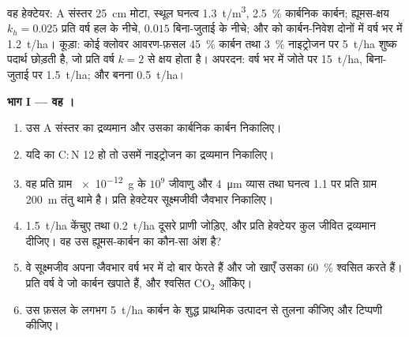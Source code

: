\begin{problem}
\label{pb:b2:living-soil:1}
वह हेक्टेयर: A संस्तर \qty{25}{cm} मोटा, स्थूल घनत्व
\qty{1.3}{t/m^3}, \qty{2.5}{\%} कार्बनिक कार्बन; ह्यूमस-क्षय $k_h =
0.025$ प्रति वर्ष हल के नीचे, $0.015$ बिना-जुताई के नीचे; और  को
कार्बन-निवेश दोनों में वर्ष भर में \qty{1.2}{t/ha}। कूड़ा: कोई
क्लोवर आवरण-फ़सल \qty{45}{\%} कार्बन तथा \qty{3}{\%} नाइट्रोजन पर
\qty{5}{t/ha} शुष्क पदार्थ छोड़ती है, जो प्रति वर्ष $k = 2$
से क्षय होता है। अपरदन: वर्ष भर में जोते पर \qty{15}{t/ha}, बिना-जुताई पर
\qty{1.5}{t/ha}; और बनना \qty{0.5}{t/ha}।

\medskip
\noindent\textbf{भाग I --- वह ।}
\begin{enumerate}
  \item उस A संस्तर का द्रव्यमान और उसका कार्बनिक कार्बन निकालिए।
  \item यदि  का $\mathrm{C:N}$ 12 हो तो उसमें
        नाइट्रोजन का द्रव्यमान निकालिए।
  \item वह  प्रति ग्राम \qty{e-12}{g} के $10^{9}$ जीवाणु
        और \qty{4}{\micro m} व्यास तथा घनत्व 1.1 पर प्रति ग्राम \qty{200}{m}
        तंतु थामे है। प्रति हेक्टेयर सूक्ष्मजीवी जैवभार
        निकालिए।
  \item \qty{1.5}{t/ha} केंचुए तथा \qty{0.2}{t/ha}
        दूसरे प्राणी जोड़िए, और प्रति हेक्टेयर कुल जीवित द्रव्यमान दीजिए।
        वह उस ह्यूमस-कार्बन का कौन-सा अंश है?
  \item वे सूक्ष्मजीव अपना जैवभार वर्ष भर में दो बार फेरते हैं और
        जो खाएँ उसका \qty{60}{\%} श्वसित करते हैं। प्रति वर्ष वे जो कार्बन
        खपाते हैं, और श्वसित $\mathrm{CO_2}$ आँकिए।
  \item उस फ़सल के लगभग \qty{5}{t/ha} कार्बन के शुद्ध प्राथमिक उत्पादन से
        तुलना कीजिए और टिप्पणी कीजिए।
\end{enumerate}


\end{problem}
